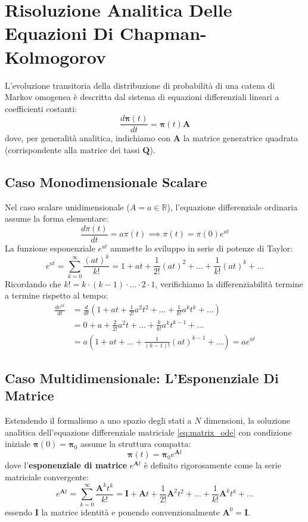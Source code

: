 \documentclass[11pt, a4paper]{article}
\begin{document}
\section{Risoluzione Analitica Delle Equazioni Di Chapman-Kolmogorov}

L'evoluzione transitoria della distribuzione di probabilità di una catena di Markov omogenea è descritta dal sistema di equazioni differenziali lineari a coefficienti costanti:
\begin{equation}
    \frac{d\bm{\pi}(t)}{dt} = \bm{\pi}(t)\bm{A} \label{eq:matrix_ode}
\end{equation}
dove, per generalità analitica, indichiamo con $\bm{A}$ la matrice generatrice quadrata (corrispondente alla matrice dei tassi $\bm{Q}$).

\subsection{Caso Monodimensionale Scalare}

Nel caso scalare unidimensionale ($A = a \in \mathbb{R}$), l'equazione differenziale ordinaria assume la forma elementare:
\[
    \frac{d\pi(t)}{dt} = a\pi(t) \implies \pi(t) = \pi(0)e^{at}
\]
La funzione esponenziale $e^{at}$ ammette lo sviluppo in serie di potenze di Taylor:
\[
    e^{at} = \sum_{k=0}^{\infty} \frac{(at)^k}{k!} = 1 + at + \frac{1}{2!}(at)^2 + \dots + \frac{1}{k!}(at)^k + \dots
\]
Ricordando che $k! = k \cdot (k-1) \cdot \dots \cdot 2 \cdot 1$, verifichiamo la differenziabilità termine a termine rispetto al tempo:
\begin{align*}
    \frac{d e^{at}}{dt} &= \frac{d}{dt} \left( 1 + at + \frac{1}{2!}a^2 t^2 + \dots + \frac{1}{k!}a^k t^k + \dots \right) \\
    &= 0 + a + \frac{2}{2!}a^2 t + \dots + \frac{k}{k!}a^k t^{k-1} + \dots \\
    &= a \left( 1 + at + \dots + \frac{1}{(k-1)!}(at)^{k-1} + \dots \right) = a e^{at}
\end{align*}

\subsection{Caso Multidimensionale: L'Esponenziale Di Matrice}

Estendendo il formalismo a uno spazio degli stati a $N$ dimensioni, la soluzione analitica dell'equazione differenziale matriciale \eqref{eq:matrix_ode} con condizione iniziale $\bm{\pi}(0) = \bm{\pi}_0$ assume la struttura compatta:
\[
    \boxed{\bm{\pi}(t) = \bm{\pi}_0 e^{\bm{A}t}}
\]
dove l'\textbf{esponenziale di matrice} $e^{\bm{A}t}$ è definito rigorosamente come la serie matriciale convergente:
\[
    \boxed{e^{\bm{A}t} = \sum_{k=0}^{\infty} \frac{\bm{A}^k t^k}{k!} = \bm{I} + \bm{A}t + \frac{1}{2!}\bm{A}^2 t^2 + \dots + \frac{1}{k!}\bm{A}^k t^k + \dots}
\]
essendo $\bm{I}$ la matrice identità e ponendo convenzionalmente $\bm{A}^0 = \bm{I}$.
\end{document}
